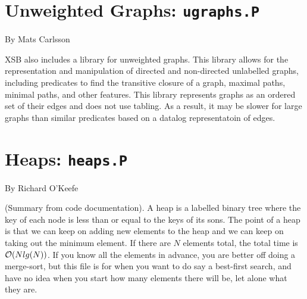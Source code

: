 %

\section{Unweighted Graphs: {\tt ugraphs.P}}

By Mats Carlsson

%
XSB also includes a library for unweighted graphs.  This library
allows for the representation and manipulation of directed and
non-directed unlabelled graphs, including predicates to find the
transitive closure of a graph, maximal paths, minimal paths, and other
features.  This library represents graphs as an ordered set of their
edges and does not use tabling.  As a result, it may be slower for
large graphs than similar predicates based on a datalog representatoin
of edges.

\section{Heaps: {\tt heaps.P}}

By Richard O'Keefe

(Summary from code documentation).  A heap is a labelled binary tree
where the key of each node is less than or equal to the keys of its
sons.  The point of a heap is that we can keep on adding new elements
to the heap and we can keep on taking out the minimum element.  If
there are $N$ elements total, the total time is ${\cal O} (Nlg(N))$.  If
you know all the elements in advance, you are better off doing a
merge-sort, but this file is for when you want to do say a best-first
search, and have no idea when you start how many elements there will
be, let alone what they are.


